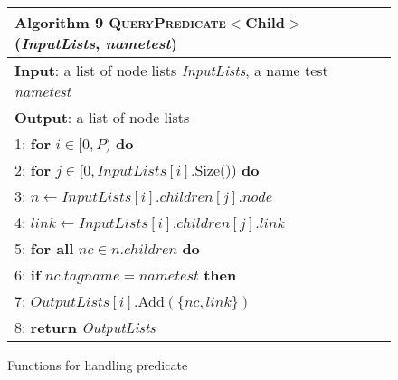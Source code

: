 \begin{figure}[t]
	\centering
	\label{fig:algQueryChild}
	\begin{tabular}{l}
		\hline
		\textbf{Algorithm 9} \textsc{QueryPredicate}$<$Child$>$ (\emph{InputLists}, \emph{nametest}) \\
		\hline
		\textbf{Input}: a list of node lists \emph{InputLists}, a name test \emph{nametest} \\
		\textbf{Output}: a list of node lists  \\
		1: \hspace{1 mm} \textbf{for} $i \in [0, P)$ \textbf{do} \\
		2: \hspace{4 mm} \textbf{for} $j \in [0, InputLists[i]$.Size()) \textbf{do} \\
		3: \hspace{8 mm} $n \leftarrow InputLists[i].children[j].node$ \\
		4: \hspace{8 mm} $link \leftarrow InputLists[i].children[j].link$ \\
		5: \hspace{8 mm} \textbf{for all} $nc \in n.children$ \textbf{do}   \\
		6: \hspace{12 mm} \textbf{if} $nc.tagname = nametest$ \textbf{then}  \\
		7: \hspace{16 mm} $OutputLists[i]$.Add$(\{nc, link\})$ \\
		8: \hspace{1 mm} \textbf{return} \emph{OutputLists} \\
		\hline
	\end{tabular}
	\caption{Functions for handling predicate}
\end{figure}	


